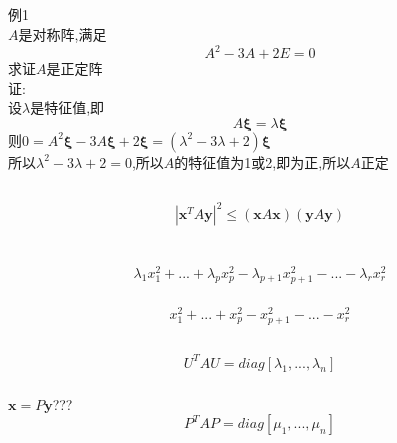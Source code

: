\documentclass[11pt, a4paper, UTF8]{ctexart}
\begin{document}
\subsection{}
例1\\
$A$是对称阵,满足
\[A^2-3A+2E=0\]
求证$A$是正定阵\\
证:\\
设$\lambda$是特征值,即
\[A\bm\xi=\lambda\bm\xi\]
则$0=A^2\bm\xi-3A\bm\xi+2\bm\xi=(\lambda^2-3\lambda+2)\bm\xi$\\
所以$\lambda^2-3\lambda+2=0$,所以$A$的特征值为1或2,即为正,所以$A$正定
\subsection{}
\[|\bm x^TA\bm y|^2\le(\bm xA\bm x)(\bm yA\bm y)\]
\section{}
\subsection{}
\subsubsection{}
\[\lambda_1x_1^2+...+\lambda_px_p^2-\lambda_{p+1}x_{p+1}^2-...-\lambda_rx_r^2\]
\subsubsection{}
\[x_1^2+...+x_p^2-x_{p+1}^2-...-x_r^2\]
\subsection{}
\subsubsection{}
\[U^TAU=diag[\lambda_1,...,\lambda_n]\]
\subsubsection{}
$\bm x=P\bm y$???
\[P^TAP=diag[\mu_1,...,\mu_n]\]
\end{document}
